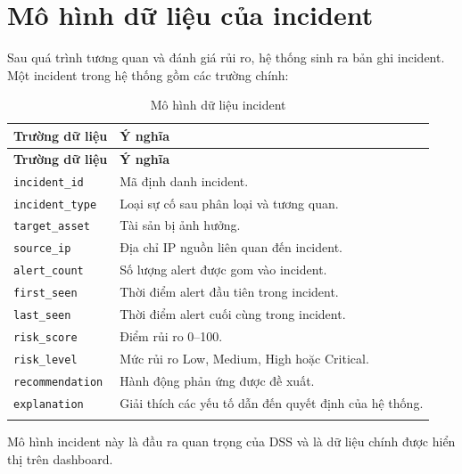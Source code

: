 \documentclass[a4paper,12pt,oneside]{book}
\begin{document}
\section{Mô hình dữ liệu của incident}
{\fontsize{13pt}{15.6pt}\selectfont

Sau quá trình tương quan và đánh giá rủi ro, hệ thống sinh ra bản ghi incident. Một incident trong hệ thống gồm các trường chính:

\begin{longtable}{|L{3.9cm}|L{10.4cm}|}
\hline
\textbf{Trường dữ liệu} & \textbf{Ý nghĩa} \\
\hline
\endfirsthead
\hline
\textbf{Trường dữ liệu} & \textbf{Ý nghĩa} \\
\hline
\endhead
\texttt{incident\_id} & Mã định danh incident. \\
\hline
\texttt{incident\_type} & Loại sự cố sau phân loại và tương quan. \\
\hline
\texttt{target\_asset} & Tài sản bị ảnh hưởng. \\
\hline
\texttt{source\_ip} & Địa chỉ IP nguồn liên quan đến incident. \\
\hline
\texttt{alert\_count} & Số lượng alert được gom vào incident. \\
\hline
\texttt{first\_seen} & Thời điểm alert đầu tiên trong incident. \\
\hline
\texttt{last\_seen} & Thời điểm alert cuối cùng trong incident. \\
\hline
\texttt{risk\_score} & Điểm rủi ro 0--100. \\
\hline
\texttt{risk\_level} & Mức rủi ro Low, Medium, High hoặc Critical. \\
\hline
\texttt{recommendation} & Hành động phản ứng được đề xuất. \\
\hline
\texttt{explanation} & Giải thích các yếu tố dẫn đến quyết định của hệ thống. \\
\hline
\caption{Mô hình dữ liệu incident}\\
\end{longtable}

\noindent Mô hình incident này là đầu ra quan trọng của DSS và là dữ liệu chính được hiển thị trên dashboard.

}
\end{document}
